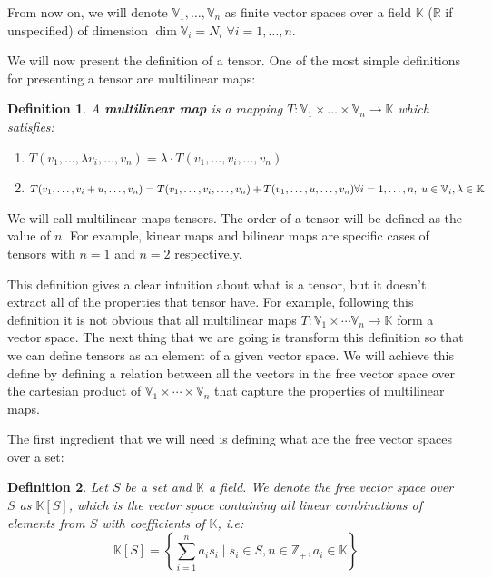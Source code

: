 \documentclass[11pt,a4paper,openright,oneside]{book}
\numberwithin{equation}{section}
\newtheorem{defn0}{Definition}[chapter]
\newenvironment{definition}{ \begin{defn0}}{\end{defn0}}
\begin{document}
From now on, we will denote $\mathbb{V}_1, \dots, \mathbb{V}_n$ as finite vector spaces over a field $\mathbb{K}$ ($\mathbb{R}$ if unspecified) of dimension $\dim{\mathbb{V}_i} = N_i \; \forall i = 1, \dots, n$.

We will now present the definition of a tensor. One of the most simple definitions for presenting a tensor
are multilinear maps:

\begin{definition}
    A \textbf{multilinear map} is a mapping ${T: \mathbb{V}_1 \times \dots \times \mathbb{V}_n \rightarrow \mathbb{K}}$ which satisfies:
    \begin{enumerate}
        \item $T(v_1, \dots, \lambda v_i, \dots, v_n) = \lambda \cdot T(v_1, \dots, v_i, \dots, v_n)$
        \item $T(v_1, \dots, v_i + u, \dots, v_n) = T(v_1, \dots, v_i, \dots, v_n) + T(v_1, \dots, u, \dots, v_n) \\ {\forall i = 1, \dots, n, \; u \in \mathbb{V}_i, \lambda \in \mathbb{K}}$
    \end{enumerate}
    \label{def:multilinear-maps}
\end{definition}


We will call multilinear maps tensors. The order of a tensor will be defined as the value of $n$.
For example, kinear maps and bilinear maps are specific cases of tensors with $n=1$ and $n=2$ respectively.

This definition gives a clear intuition about what is a tensor, but it doesn't extract all of the properties that tensor have.
For example, following this definition it is not obvious that all multilinear maps $T: \mathbb{V}_1 \times \cdots \mathbb{V}_n \rightarrow \mathbb{K}$
form a vector space. The next thing that we are going is transform this definition so that we can define tensors
as an element of a given vector space. We will achieve this define by defining a relation between all the vectors in the free vector space
over the cartesian product of $\mathbb{V}_1 \times \cdots \times \mathbb{V}_n$ that capture the properties of multilinear maps.

The first ingredient that we will need is defining what are the free vector spaces over a set:

\begin{definition} Let $S$ be a set and $\mathbb{K}$ a field. We denote the free vector space over $S$ as $\mathbb{K}[S]$, which
    is the vector space containing all linear combinations of elements from $S$ with coefficients of $\mathbb{K}$, i.e:
    $$\mathbb{K}[S] = \left\{ \sum_{i=1}^n a_i s_i \mid s_i \in S, n \in \mathbb{Z}_+, a_i \in \mathbb{K}  \right\}$$
\end{definition}
\end{document}
